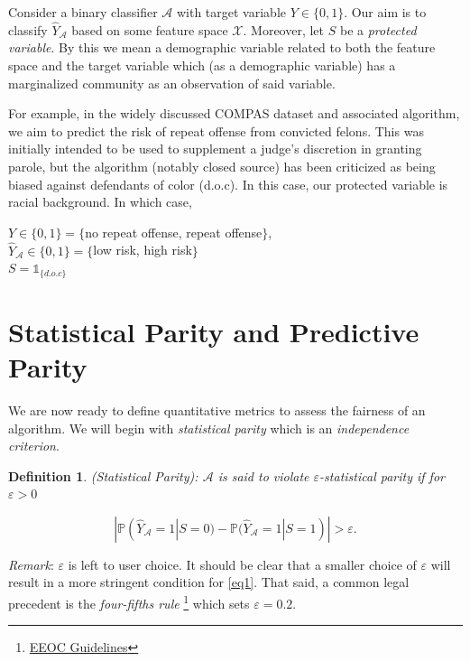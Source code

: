 \documentclass[11pt]{article}
\newtheorem{definition}{Definition}
\begin{document}
Consider a binary classifier $\mathcal{A}$ with target variable $Y \in \{0,1\}$.  Our aim is to classify $\hat{Y}_{\mathcal{A}}$ based on some feature space $\mathcal{X}$.  Moreover, let $S$ be a \textit{protected variable}.  By this we mean a demographic variable related to both the feature space and the target variable which (as a demographic variable) has a marginalized community as an observation of said variable.  

For example, in the widely discussed COMPAS\cite{comp} dataset and associated algorithm, we aim to predict the risk of repeat offense from convicted felons.  This was initially intended to be used to supplement a judge's discretion in granting parole, but the algorithm (notably closed source) has been criticized as being biased against defendants of color (d.o.c).  In this case, our protected variable is racial background.  In which case, 

\begin{center}
$Y \in \{0,1\} = \{$no repeat offense, repeat offense$\}$, \\
$\hat{Y}_{\mathcal{A}} \in \{0,1\} = \{$low risk, high risk$\}$\\
$S = \mathbb{1}_{\{d.o.c\}}$

\end{center}

\section{Statistical Parity and Predictive Parity} 

We are now ready to define quantitative metrics to assess the fairness of an algorithm.  We will begin with \textit{statistical parity} which is an \textit{independence criterion}.  

\begin{definition}
\textit{(Statistical Parity)}: $\mathcal{A}$ is said to violate $\varepsilon$-statistical parity if for $\varepsilon>0$ 

\begin{equation}\label{eq1}
|\mathbb{P}(\hat{Y}_{\mathcal{A}} = 1|S = 0)-\mathbb{P}(\hat{Y}_{\mathcal{A}} = 1| S = 1)|>\varepsilon.
\end{equation} 

\end{definition} 

\textit{Remark}: $\varepsilon$ is left to user choice.  It should be clear that a smaller choice of $\varepsilon$ will result in a more stringent condition for \ref{eq1}.  That said, a common legal precedent is the \textit{four-fifths rule} \footnote{\href{https://www.govinfo.gov/content/pkg/CFR-2017-title29-vol4/xml/CFR-2017-title29-vol4-part1607.xml}{EEOC Guidelines}} which sets $\varepsilon = 0.2$.  
\end{document}

